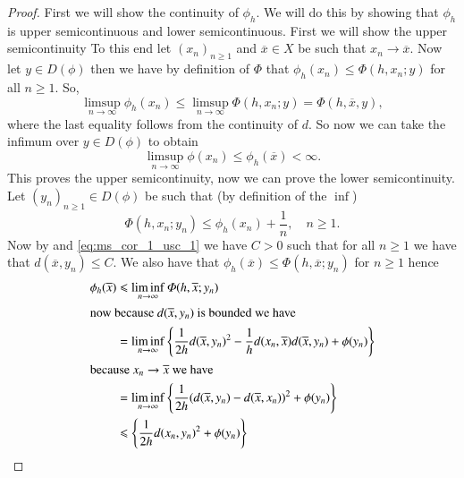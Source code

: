 \documentclass[a4paper,11pt, leqno]{scrreprt} %
\renewcommand{\leq}{\leqslant}
\renewcommand{\leq}{\leqslant}
\renewcommand{\geq}{\geqslant}
\theoremstyle{change}
\theoremstyle{nonumberplain}
\newtheorem{proof}{Proof}
\begin{document}
\begin{proof}
  First we will show the continuity of $\phi_h$. We will do this by
  showing that $\phi_h$ is upper semicontinuous and lower
  semicontinuous. First we will show the upper semicontinuity
  To this end let $(x_n)_{n \geq 1}$ and $\overline{x} \in X$ be such
  that $x_n \to \overline{x}$. Now let $y \in D(\phi)$ then we have by
  definition of $\Phi$ that $\phi_h(x_n) \leq \Phi(h, x_n; y)$ for all
  $n \geq 1$. So,
  \begin{equation}
    \label{eq:ms_cor_1_usc_1}
    \limsup_{n \to \infty} \phi_h(x_n) \leq \limsup_{n \to \infty}
    \Phi(h, x_n; y) = \Phi(h, \overline{x}, y),
  \end{equation}
  where the last equality follows from the continuity of $d$. So now
  we can take the infimum over $y \in D(\phi)$ to obtain
  \begin{equation}
    \label{eq:ms_cor_1_usc_2}
    \limsup_{n \to \infty} \phi(x_n) \leq \phi_h(\overline{x}) < \infty.
  \end{equation}
  This proves the upper semicontinuity, now we can prove the lower
  semicontinuity. Let $(y_n)_{n \geq 1} \in D(\phi)$ be such that (by
  definition of the $\inf$)
  \begin{equation}
    \label{eq:ms_cor_1_lsc_1}
    \Phi(h, x_n; y_n) \leq \phi_h(x_n) + \frac1n, \quad n \geq 1.
  \end{equation}
  Now by  and \eqref{eq:ms_cor_1_usc_1} we have $C > 0$
  such that for all $n \geq 1$ we have that $d(\overline{x}, y_n) \leq
  C$. We also have that $\phi_h(\overline{x}) \leq \Phi(h,
  \overline{x}; y_n)$ for $n \geq 1$ hence
  \begin{equation}
    \label{eq:ms_cor_1_lsc_2}
    \begin{split}
      \phi_h(\overline{x}) &\leq \liminf_{n \to \infty} \Phi(h,
      \overline{x}; y_n)\\
      \shortintertext{now because $d(\overline{x}, y_n)$ is bounded we
        have}
      &=\liminf_{n \to \infty} \left \{ \frac1{2h} d(\overline{x},
        y_n)^2 - \frac1h d(x_n, \overline{x})d(\overline{x}, y_n) +
        \phi(y_n) \right \}\\
      \shortintertext{because $x_n \to \overline{x}$ we have}
      &=\liminf_{n \to \infty} \left \{ \frac1{2h} (d(\overline{x},
        y_n) - d(\overline{x}, x_n))^2 + \phi(y_n) \right \}\\
      &\leq \left \{\frac1{2h} d(x_n, y_n)^2 + \phi(y_n) \right \}\\

\end{split}
\end{equation}
\end{proof}
\end{document}
